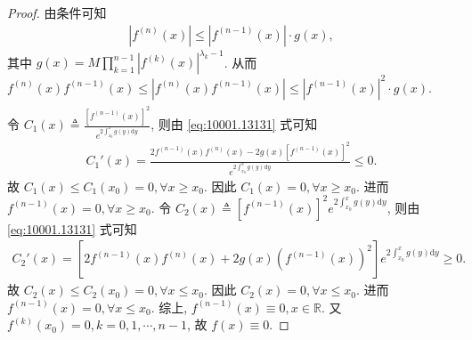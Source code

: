 \documentclass[../../main.tex]{subfiles}
\begin{document}
\begin{proof}
由条件可知
\begin{align*}
|f^{(n)}(x)| \leqslant |f^{(n-1)}(x)| \cdot g(x),
\end{align*}
其中 $g(x) = M \prod_{k=1}^{n-1} |f^{(k)}(x)|^{\lambda_k - 1}$. 从而 $f^{(n)}(x) f^{(n-1)}(x) \leqslant |f^{(n)}(x) f^{(n-1)}(x)| \leqslant |f^{(n-1)}(x)|^2 \cdot g(x)$.
\begin{align}
\label{eq:10001.13131}
\end{align}
令 $C_1(x) \triangleq \frac{[f^{(n-1)}(x)]^2}{e^{2\int_{x_0}^x g(y) \mathrm{d}y}}$, 则由 \eqref{eq:10001.13131} 式可知
\begin{align*}
C_1'(x) = \frac{2f^{(n-1)}(x) f^{(n)}(x) - 2g(x) [f^{(n-1)}(x)]^2}{e^{2\int_{x_0}^x g(y) \mathrm{d}y}} \leqslant 0.
\end{align*}
故 $C_1(x) \leqslant C_1(x_0) = 0, \forall x \geqslant x_0$. 因此 $C_1(x) = 0, \forall x \geqslant x_0$. 进而 $f^{(n-1)}(x) = 0, \forall x \geqslant x_0$.
令 $C_2(x) \triangleq [f^{(n-1)}(x)]^2 e^{2\int_{x_0}^x g(y) \mathrm{d}y}$, 则由 \eqref{eq:10001.13131} 式可知
\begin{align*}
C_2'(x) = \left[ 2f^{(n-1)}(x) f^{(n)}(x) + 2g(x) (f^{(n-1)}(x))^2 \right] e^{2\int_{x_0}^x g(y) \mathrm{d}y} \geqslant 0.
\end{align*}
故 $C_2(x) \leqslant C_2(x_0) = 0, \forall x \leqslant x_0$. 因此 $C_2(x) = 0, \forall x \leqslant x_0$. 进而 $f^{(n-1)}(x) = 0, \forall x \leqslant x_0$.
综上, $f^{(n-1)}(x) \equiv 0, x \in \mathbb{R}$. 又 $f^{(k)}(x_0) = 0, k = 0, 1, \cdots, n-1$, 故 $f(x) \equiv 0$.

\end{proof}
\end{document}

